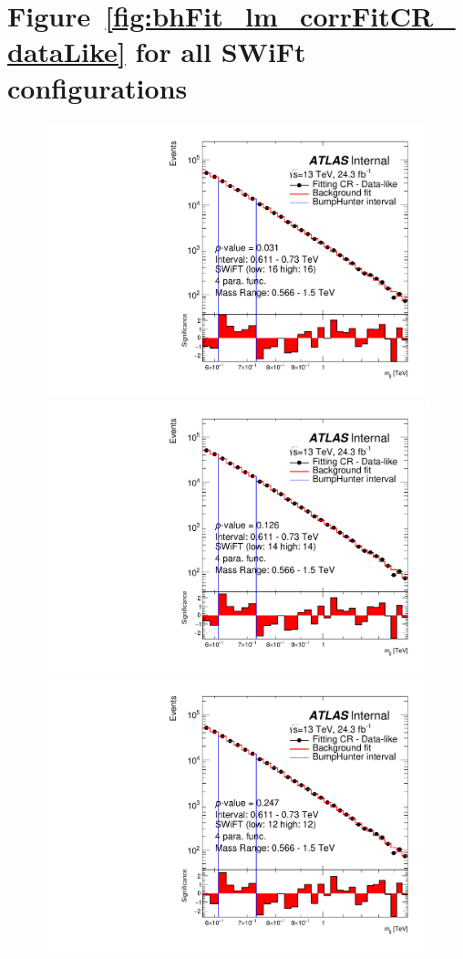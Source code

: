 \begin{figure}
{}    
\end{figure}

\clearpage
\vspace{2em}
\section{Figure~\ref{fig:bhFit_lm_corrFitCR_dataLike} for all SWiFt configurations}
\vspace{3em}

\begin{figure}[!htb]
\captionsetup[subfigure]{aboveskip=0pt,justification=centering}
\centering
{} {
  \includegraphics[width=0.48\linewidth, angle=0]{figs/Dibjet/LowMass/FitStudy_min566/bhFit_corrFitCR_dataLike_v13_4para_low16_high16.pdf}
}
 {
  \includegraphics[width=0.48\linewidth, angle=0]{figs/Dibjet/LowMass/FitStudy_min566/bhFit_corrFitCR_dataLike_v13_4para_low14_high14.pdf}
}
 {
  \includegraphics[width=0.48\linewidth, angle=0]{figs/Dibjet/LowMass/FitStudy_min566/bhFit_corrFitCR_dataLike_v13_4para_low12_high12.pdf}
}
 {
}
\end{figure}
